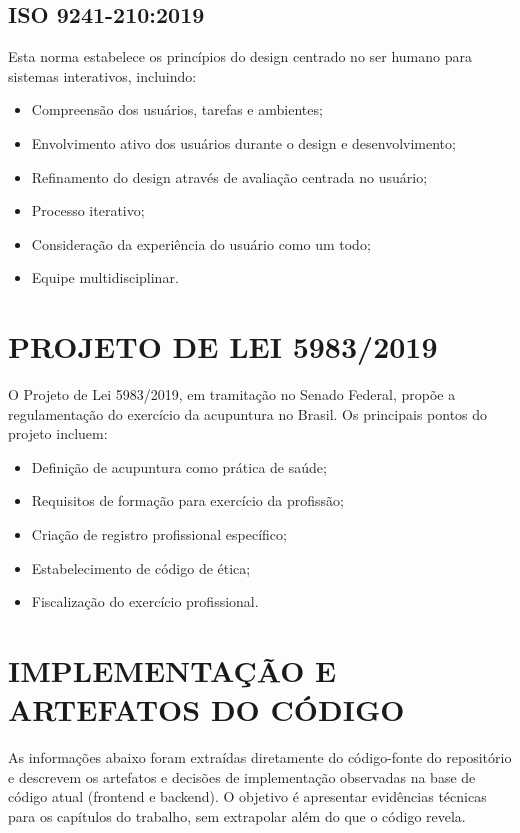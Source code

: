 \subsection{ISO 9241-210:2019}

Esta norma estabelece os princípios do design centrado no ser humano para sistemas interativos, incluindo:

\begin{itemize}
    \item Compreensão dos usuários, tarefas e ambientes;
    \item Envolvimento ativo dos usuários durante o design e desenvolvimento;
    \item Refinamento do design através de avaliação centrada no usuário;
    \item Processo iterativo;
    \item Consideração da experiência do usuário como um todo;
    \item Equipe multidisciplinar.
\end{itemize}

\section{PROJETO DE LEI 5983/2019}

O Projeto de Lei 5983/2019, em tramitação no Senado Federal, propõe a regulamentação do exercício da acupuntura no Brasil. Os principais pontos do projeto incluem:

\begin{itemize}
    \item Definição de acupuntura como prática de saúde;
    \item Requisitos de formação para exercício da profissão;
    \item Criação de registro profissional específico;
    \item Estabelecimento de código de ética;
    \item Fiscalização do exercício profissional.
\end{itemize}

\section{IMPLEMENTAÇÃO E ARTEFATOS DO CÓDIGO}
\label{ax:artefatos}

As informações abaixo foram extraídas diretamente do código-fonte do repositório e descrevem os artefatos e decisões de implementação observadas na base de código atual (frontend e backend). O objetivo é apresentar evidências técnicas para os capítulos do trabalho, sem extrapolar além do que o código revela.

